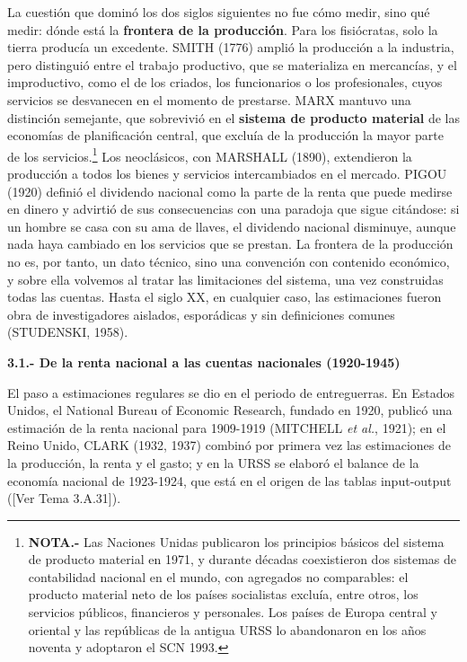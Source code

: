 \documentclass[10pt,a4paper]{article}
\newcommand{\authorfont}[1]{{\fontfamily{EBGaramond-TLF}\selectfont #1}}
\begin{document}
La cuestión que dominó los dos siglos siguientes no fue cómo medir, sino qué medir: dónde está la \textbf{frontera de la producción}. Para los fisiócratas, solo la tierra producía un excedente. SMITH (1776) amplió la producción a la industria, pero distinguió entre el trabajo productivo, que se materializa en mercancías, y el improductivo, como el de los criados, los funcionarios o los profesionales, cuyos servicios se desvanecen en el momento de prestarse. MARX mantuvo una distinción semejante, que sobrevivió en el \textbf{sistema de producto material} de las economías de planificación central, que excluía de la producción la mayor parte de los servicios.\footnote{%
    \textbf{NOTA.-} Las Naciones Unidas publicaron los principios básicos del sistema de producto material en 1971, y durante décadas coexistieron dos sistemas de contabilidad nacional en el mundo, con agregados no comparables: el producto material neto de los países socialistas excluía, entre otros, los servicios públicos, financieros y personales. Los países de Europa central y oriental y las repúblicas de la antigua URSS lo abandonaron en los años noventa y adoptaron el SCN 1993.
} Los neoclásicos, con MARSHALL (1890), extendieron la producción a todos los bienes y servicios intercambiados en el mercado. PIGOU (1920) definió el dividendo nacional como la parte de la renta que puede medirse en dinero y advirtió de sus consecuencias con una paradoja que sigue citándose: si un hombre se casa con su ama de llaves, el dividendo nacional disminuye, aunque nada haya cambiado en los servicios que se prestan. La frontera de la producción no es, por tanto, un dato técnico, sino una convención con contenido económico, y sobre ella volvemos al tratar las limitaciones del sistema, una vez construidas todas las cuentas. Hasta el siglo XX, en cualquier caso, las estimaciones fueron obra de investigadores aislados, esporádicas y sin definiciones comunes (STUDENSKI, 1958).

\textbf{3.1.- De la renta nacional a las cuentas nacionales (1920-1945)}

El paso a estimaciones regulares se dio en el periodo de entreguerras. En Estados Unidos, el National Bureau of Economic Research, fundado en 1920, publicó una estimación de la renta nacional para 1909-1919 (MITCHELL \textit{et al.}, 1921); en el Reino Unido, CLARK (1932, 1937) combinó por primera vez las estimaciones de la producción, la renta y el gasto; y en la URSS se elaboró el balance de la economía nacional de 1923-1924, que está en el origen de las tablas input-output ([\authorfont{Ver Tema 3.A.31}]).
\end{document}

